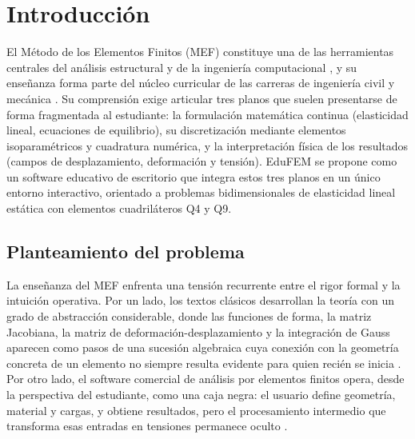 \chapter*{Introducción}

El Método de los Elementos Finitos (MEF) constituye una de las herramientas centrales del análisis estructural y de la ingeniería computacional \autocite{zienkiewicz2013fem,cook2002concepts}, y su enseñanza forma parte del núcleo curricular de las carreras de ingeniería civil y mecánica \autocite[p.~1160]{perezsantiago2023fem}. Su comprensión exige articular tres planos que suelen presentarse de forma fragmentada al estudiante: la formulación matemática continua (elasticidad lineal, ecuaciones de equilibrio), su discretización mediante elementos isoparamétricos y cuadratura numérica, y la interpretación física de los resultados (campos de desplazamiento, deformación y tensión). EduFEM se propone como un software educativo de escritorio que integra estos tres planos en un único entorno interactivo, orientado a problemas bidimensionales de elasticidad lineal estática con elementos cuadriláteros Q4 y Q9.

\section*{Planteamiento del problema}

La enseñanza del MEF enfrenta una tensión recurrente entre el rigor formal y la intuición operativa. Por un lado, los textos clásicos desarrollan la teoría con un grado de abstracción considerable, donde las funciones de forma, la matriz Jacobiana, la matriz de deformación-desplazamiento y la integración de Gauss aparecen como pasos de una sucesión algebraica cuya conexión con la geometría concreta de un elemento no siempre resulta evidente para quien recién se inicia \autocite{bathe2014fem,reddy2006introduction}. Por otro lado, el software comercial de análisis por elementos finitos opera, desde la perspectiva del estudiante, como una caja negra: el usuario define geometría, material y cargas, y obtiene resultados, pero el procesamiento intermedio que transforma esas entradas en tensiones permanece oculto \autocite[p.~1160]{perezsantiago2023fem}.

